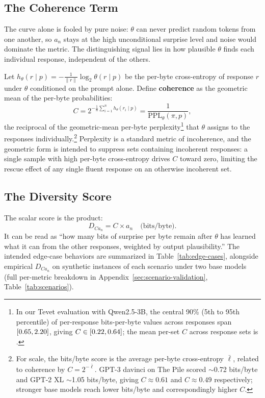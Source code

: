\subsection{The Coherence Term}\label{sec:coherence}

The curve alone is fooled by pure noise: $\theta$ can never predict random tokens from one another, so $a_n$ stays at the high unconditional surprise level and noise would dominate the metric.
The distinguishing signal lies in how plausible $\theta$ finds each individual response, independent of the others.

Let $h_\theta(r \mid p) = -\frac{1}{\|r\|}\log_2 \theta(r \mid p)$ be the per-byte cross-entropy of response $r$ under $\theta$ conditioned on the prompt alone.
Define \textbf{coherence} as the geometric mean of the per-byte probabilities:
\begin{equation}\label{eq:coherence}
    C = 2^{-\frac{1}{n}\sum_{i=1}^{n} h_\theta(r_i \mid p)} = \frac{1}{\mathrm{PPL}_\theta(\pi, p)},
\end{equation}
the reciprocal of the geometric-mean per-byte perplexity\footnote{In our Tevet evaluation with Qwen2.5-3B, the central 90\% (5th to 95th percentile) of per-response bits-per-byte values across \tevetCoherenceRespCount{} responses span $[0.65, 2.20]$, giving $C \in [0.22, 0.64]$; the mean per-set $C$ across \tevetCoherenceSetCount{} response sets is \tevetCoherenceMeanC.} that $\theta$ assigns to the responses individually.\footnote{For scale, the bits/byte score is the average per-byte cross-entropy $\bar{\ell}$, related to coherence by $C = 2^{-\bar{\ell}}$. GPT-3 davinci on The Pile \citep{gao2020pile} scored $\sim$0.72 bits/byte and GPT-2 XL $\sim$1.05 bits/byte, giving $C \approx 0.61$ and $C \approx 0.49$ respectively; stronger base models reach lower bits/byte and correspondingly higher $C$.}
Perplexity is a standard metric of incoherence, and the geometric form is intended to suppress sets containing incoherent responses: a single sample with high per-byte cross-entropy drives $C$ toward zero, limiting the rescue effect of any single fluent response on an otherwise incoherent set.

\subsection{The Diversity Score}\label{sec:scalar}

The scalar score is the product:
\begin{equation}\label{eq:D-Can}
    D_{Ca_n} = C \times a_n \quad \text{(bits/byte).}
\end{equation}
It can be read as ``how many bits of surprise per byte remain after $\theta$ has learned what it can from the other responses, weighted by output plausibility.''
The intended edge-case behaviors are summarized in Table~\ref{tab:edge-cases}, alongside empirical $D_{Ca_n}$ on synthetic instances of each scenario under two base models (full per-metric breakdown in Appendix~\ref{sec:scenario-validation}, Table~\ref{tab:scenarios}).

